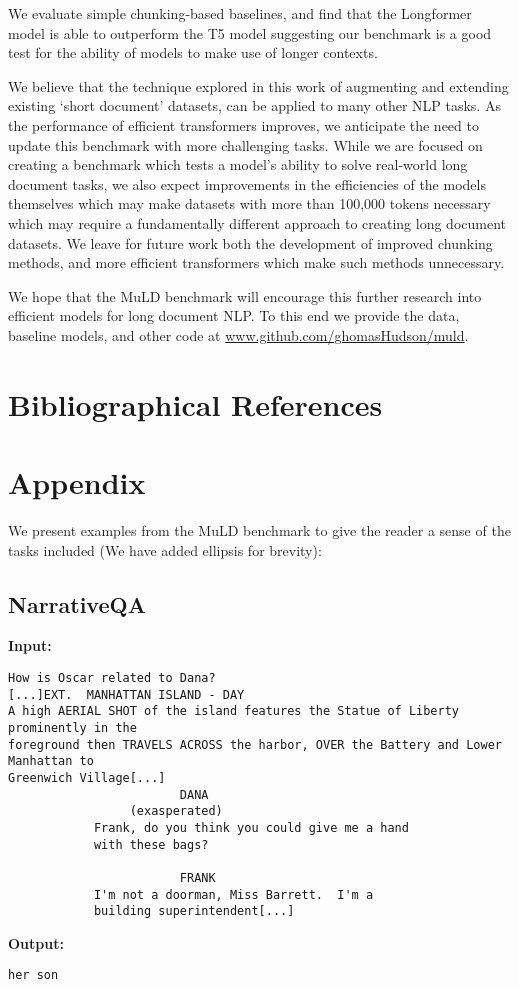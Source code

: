 \documentclass[10pt, a4paper]{article}
\begin{document}
We evaluate simple chunking-based baselines, and find that the Longformer model is able to outperform the T5 model suggesting our benchmark is a good test for the ability of models to make use of longer contexts. 

We believe that the technique explored in this work of augmenting and extending existing `short document' datasets, can be applied to many other NLP tasks. As the performance of efficient transformers improves, we anticipate the need to update this benchmark with more challenging tasks. While we are focused on creating a benchmark which tests a model's ability to solve real-world long document tasks, we also expect improvements in the efficiencies of the models themselves which may make datasets with more than 100,000 tokens necessary which may require a fundamentally different approach to creating long document datasets. We leave for future work both the development of improved chunking methods, and more efficient transformers which make such methods unnecessary. 

We hope that the MuLD benchmark will encourage this further research into efficient models for long document NLP. To this end we provide the data, baseline models, and other code at \url{www.github.com/ghomasHudson/muld}.
\section{Bibliographical References}\label{reference}





\label{lr:ref}

\onecolumn
\section*{Appendix}
We present examples from the MuLD benchmark to give the reader a sense of the tasks included (We have added ellipsis for brevity):

\subsection*{NarrativeQA}
\textbf{Input:}
\begin{lstlisting}
How is Oscar related to Dana?
[...]EXT.  MANHATTAN ISLAND - DAY
A high AERIAL SHOT of the island features the Statue of Liberty prominently in the
foreground then TRAVELS ACROSS the harbor, OVER the Battery and Lower Manhattan to 
Greenwich Village[...]
						DANA
				 (exasperated)
			Frank, do you think you could give me a hand
			with these bags?

						FRANK
			I'm not a doorman, Miss Barrett.  I'm a
			building superintendent[...]
\end{lstlisting}
\textbf{Output:}
\begin{lstlisting}
her son
\end{lstlisting}
\end{document}

